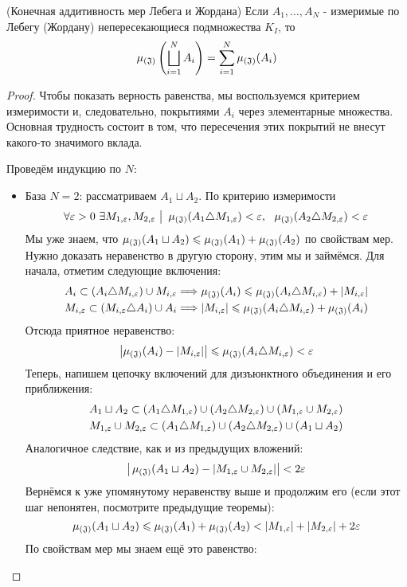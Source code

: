 \begin{theorem} (Конечная аддитивность мер Лебега и Жордана)
	Если $A_1, \ldots, A_N$ - измеримые по Лебегу (Жордану) непересекающиеся подмножества $K_I$, то 
	\[
		\operatorname{\mu_{(\mathfrak{J})}} \left(\bigsqcup_{i = 1}^N A_i\right) = \sum_{i = 1}^N \operatorname{\mu_{(\mathfrak{J})}}(A_i)
	\]
\end{theorem}

\begin{proof}
	Чтобы показать верность равенства, мы воспользуемся критерием измеримости и, следовательно, покрытиями $A_i$ через элементарные множества. Основная трудность состоит в том, что пересечения этих покрытий не внесут какого-то значимого вклада.
	
	Проведём индукцию по $N$:
	\begin{itemize}
		\item База $N = 2$: рассматриваем $A_1 \sqcup A_2$. По критерию измеримости
		\[
			\forall \varepsilon > 0\ \exists M_{1, \varepsilon}, M_{2, \varepsilon} \ \big|\  \operatorname{\mu_{(\mathfrak{J})}}(A_1 \triangle M_{1, \varepsilon}) < \varepsilon,\ \ \operatorname{\mu_{(\mathfrak{J})}}(A_2 \triangle M_{2, \varepsilon}) < \varepsilon
		\]
		Мы уже знаем, что $\operatorname{\mu_{(\mathfrak{J})}}(A_1 \sqcup A_2) \leqslant \operatorname{\mu_{(\mathfrak{J})}}(A_1) + \operatorname{\mu_{(\mathfrak{J})}}(A_2)$ по свойствам мер. Нужно доказать неравенство в другую сторону, этим мы и займёмся. Для начала, отметим следующие включения:
		\begin{align*}
			&{A_i \subset (A_i \triangle M_{i, \varepsilon}) \cup M_{i, \varepsilon} \Longrightarrow \operatorname{\mu_{(\mathfrak{J})}}(A_i) \leqslant \operatorname{\mu_{(\mathfrak{J})}}(A_i \triangle M_{i, \varepsilon}) + |M_{i, \varepsilon}|}
			\\
			&{M_{i, \varepsilon} \subset (M_{i, \varepsilon} \triangle A_i) \cup A_i \Longrightarrow |M_{i, \varepsilon}| \leqslant \operatorname{\mu_{(\mathfrak{J})}}(A_i \triangle M_{i, \varepsilon}) + \operatorname{\mu_{(\mathfrak{J})}}(A_i)}
		\end{align*}
		Отсюда приятное неравенство:
		\[
			\left|\operatorname{\mu_{(\mathfrak{J})}}(A_i) - |M_{i, \varepsilon}|\right| \leqslant \operatorname{\mu_{(\mathfrak{J})}}(A_i \triangle M_{i, \varepsilon}) < \varepsilon
		\]
		Теперь, напишем цепочку включений для дизъюнктного объединения и его приближения:
		\begin{align*}
			&{A_1 \sqcup A_2 \subset (A_1 \triangle M_{1, \varepsilon}) \cup (A_2 \triangle M_{2, \varepsilon}) \cup (M_{1, \varepsilon} \cup M_{2, \varepsilon})}
			\\
			&{M_{1, \varepsilon} \cup M_{2, \varepsilon} \subset (A_1 \triangle M_{1, \varepsilon}) \cup (A_2 \triangle M_{2, \varepsilon}) \cup (A_1 \sqcup A_2)}
		\end{align*}
		Аналогичное следствие, как и из предыдущих вложений:
		\[
			\big|\operatorname{\mu_{(\mathfrak{J})}}(A_1 \sqcup A_2) - |M_{1, \varepsilon} \cup M_{2, \varepsilon}|\big| < 2\varepsilon
		\]
		Вернёмся к уже упомянутому неравенству выше и продолжим его (если этот шаг непонятен, посмотрите предыдущие теоремы):
		\[
			\operatorname{\mu_{(\mathfrak{J})}}(A_1 \sqcup A_2) \leqslant \operatorname{\mu_{(\mathfrak{J})}}(A_1) + \operatorname{\mu_{(\mathfrak{J})}}(A_2) < |M_{1, \varepsilon}| + |M_{2, \varepsilon}| + 2\varepsilon
		\]
		По свойствам мер мы знаем ещё это равенство:

\end{itemize}
\end{proof}

